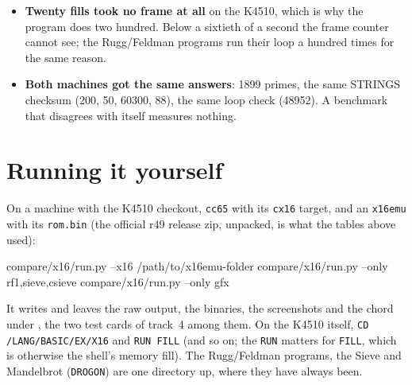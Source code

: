\begin{itemize}
  run the X16 won it clock for clock, 0.4x at 8\,MHz: VERA's data port
  steps its own address, so a row of text is one address and eighty
  stores, where the K4510 worked out a 32-bit address in C for every
  \texttt{far\_poke}. The K4510 then grew the same thing, two data
  ports that move themselves, and a see-through bit for text32
  (Chapter~\ref{cha:io}). TEXT went from 61 to 27\,ms at 8\,MHz, 0.9x,
  and from 12.1 to 5.4\,ms at the K4510's own clock.
\item \textbf{Twenty fills took no frame at all} on the K4510, which
  is why the program does two hundred. Below a sixtieth of a second
  the frame counter cannot see; the Rugg/Feldman programs run their
  loop a hundred times for the same reason.
\item \textbf{Both machines got the same answers}: 1899 primes, the
  same STRINGS checksum (200, 50, 60300, 88), the same loop
  check (48952). A benchmark that disagrees with itself measures
  nothing.
\end{itemize}

\section{Running it yourself}
On a machine with the K4510 checkout, \texttt{cc65} with its
\texttt{cx16} target, and an \texttt{x16emu} with its
\texttt{rom.bin} (the official r49 release zip, unpacked, is
what the tables above used):

\begin{type}
compare/x16/run.py --x16 /path/to/x16emu-folder
compare/x16/run.py --only rf1,sieve,csieve
compare/x16/run.py --only gfx
\end{type}

It writes  and leaves the raw
output, the binaries, the screenshots and the chord under
, the two test cards of track~4 among
them. On the K4510 itself, \texttt{CD
/LANG/BASIC/EX/X16} and \texttt{RUN FILL} (and so on; the
\texttt{RUN} matters for \texttt{FILL}, which is otherwise the
shell's memory fill). The Rugg/Feldman programs, the Sieve and
Mandelbrot (\texttt{DROGON}) are one directory up, where they
have always been.
